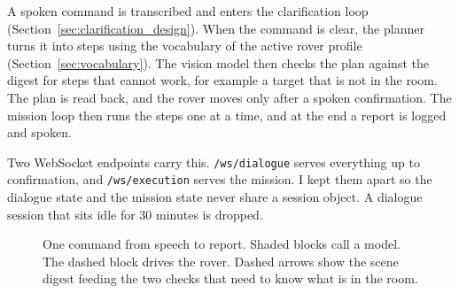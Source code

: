 A spoken command is transcribed and enters the clarification loop
(Section~\ref{sec:clarification_design}). When the command is clear, the planner
turns it into steps using the vocabulary of the active rover profile
(Section~\ref{sec:vocabulary}). The vision model then checks the plan against the
digest for steps that cannot work, for example a target that is not in the room.
The plan is read back, and the rover moves only after a spoken confirmation. The
mission loop then runs the steps one at a time, and at the end a report is logged
and spoken.

Two WebSocket endpoints carry this. \texttt{/ws/dialogue} serves everything up to
confirmation, and \texttt{/ws/execution} serves the mission. I kept them apart so
the dialogue state and the mission state never share a session object. A dialogue
session that sits idle for 30 minutes is dropped.

\begin{figure}[htbp]
  \centering
  \caption{One command from speech to report. Shaded blocks call a model. The dashed block drives the rover. Dashed arrows show the scene digest feeding the two checks that need to know what is in the room.}
  \label{fig:pipeline}
\end{figure}

